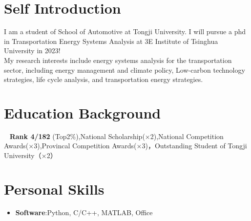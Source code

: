 \documentclass{resume}
\begin{document}


 
\section{Self Introduction}
  I am a student of School of Automotive at Tongji University. I will pursue a phd in Transportation Energy Systems Analysis at 3E Institute of Tsinghua University in 2023!  \\
My research interests include energy systems analysis for the transportation sector, including energy management and climate policy, Low-carbon technology strategies, life cycle analysis, and transportation energy strategies.

\section{Education Background}

\ \textbf{ Rank 4/182 }(Top2\%),National Scholarship(×2),National Competition Awards(×3),Provincal Competition Awards(×3)，Outstanding Student of Tongji University（×2）

\section{Personal Skills}
\begin{itemize}[parsep=0.2ex]

  \item \textbf{Software}:Python, C/C++, MATLAB, Office
\end{itemize}
\end{document}
